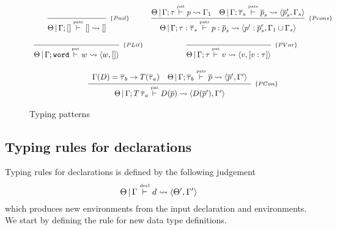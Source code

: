 \documentclass[a4paper, 11pt]{article}
\theoremstyle{definition}
\begin{document}
\begin{figure}[H]
  \[
    \begin{array}{cc}
      \infer[_{\{Pnil\}}]
            {\Theta\,|\,\Gamma ; [] \typing{pats} [] \leadsto []}
            {}
      & 
      \infer[_{\{Pcons\}}]
            {\Theta\,|\,\Gamma ; \tau : \overline{\tau}_s \typing{pats} p : \overline{p}_s \leadsto  \langle p' : \overline{p}'_s, \Gamma_1 \cup \Gamma_s \rangle}
            {\Theta\,|\,\Gamma ; \tau \typing{pat} p \leadsto \Gamma_1 
             &
             \Theta\,|\,\Gamma ; \overline{\tau}_s \typing{pats} \overline{p}_s \leadsto \langle \overline{p}'_s, \Gamma_s \rangle}
      \\ \\ 
        \infer[_{\{PLit\}}]
              {\Theta\,|\,\Gamma ; \word \typing{pat} w \leadsto \langle w, []\rangle}
              {}
      & 
        \infer[_{\{PVar\}}]
              {\Theta\,|\,\Gamma ; \tau \typing{pat} v \leadsto \langle v, [v : \tau] \rangle}
              {}
      \\ \\
      \multicolumn{2}{c}{
        \infer[_{\{PCon\}}]
              {\Theta\,|\,\Gamma ; T\,\overline{\tau}_a \typing{pat} D(\overline{p}) \leadsto \langle D(\overline{p}'), \Gamma' \rangle}
              {\begin{array}{cc}
                  \Gamma(D) = \overline{\tau}_b \to T (\overline{\tau}_a) 
                  & 
                  \Theta\,|\,\Gamma ; \overline{\tau}_b \typing{pats} \overline{p} \leadsto \langle \overline{p}', \Gamma'\rangle
               \end{array}}
      }
    \end{array}
  \]
  \centering
  \caption{Typing patterns}
  \label{fig:patterns}
\end{figure}

\subsection{Typing rules for declarations}

Typing rules for declarations is defined by the following judgement
\[\Theta\,|\,\Gamma \overset{\text{\tiny{decl}}}{\vdash} d \leadsto \langle \Theta', \Gamma' \rangle\]
which produces new environments from the input declaration and environments.
We start by defining the rule for new data type definitions.
\end{document}
